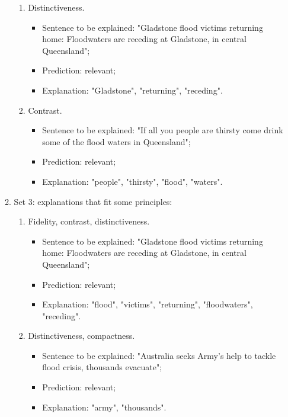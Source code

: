\begin{enumerate}
\begin{enumerate}
\begin{enumerate}
            \item Distinctiveness. \begin{itemize}
                \item Sentence to be explained: "Gladstone flood victims returning home: Floodwaters are receding at Gladstone, in central Queensland";
                \item Prediction: relevant;
                \item Explanation: "Gladstone", "returning", "receding".
            \end{itemize}
            \item Contrast. \begin{itemize}
                \item Sentence to be explained: "If all you people are thirsty come drink some of the flood waters in Queensland";
                \item Prediction: relevant;
                \item Explanation: "people", "thirsty", "flood", "waters".
            \end{itemize}
        \end{enumerate}
        
        \item Set 3: explanations that fit some principles: \begin{enumerate}
            \item Fidelity, contrast, distinctiveness. \begin{itemize}
                \item Sentence to be explained: "Gladstone flood victims returning home: Floodwaters are receding at Gladstone, in central Queensland";
                \item Prediction: relevant;
                \item Explanation: "flood", "victims", "returning", "floodwaters", "receding".
            \end{itemize}
            \item Distinctiveness, compactness. \begin{itemize}
                \item Sentence to be explained: "Australia seeks Army's help to tackle flood crisis, thousands evacuate";
                \item Prediction: relevant;
                \item Explanation: "army", "thousands".
            \end{itemize}
        \end{enumerate}
    \end{enumerate}


\end{enumerate}
